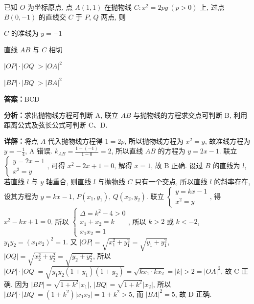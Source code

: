 \begin{question}[points=5]
已知 $O$ 为坐标原点, 点 $A(1,1)$ 在抛物线 $C: x^2 = 2py\ (p > 0)$ 上, 过点 $B(0,-1)$ 的直线交 $C$ 于 $P$, $Q$ 两点, 则
\begin{choices}
  \item $C$ 的准线为 $y = -1$
  \item 直线 $AB$ 与 $C$ 相切
  \item $|OP| \cdot |OQ| > |OA|^2$
  \item $|BP| \cdot |BQ| > |BA|^2$
\end{choices}
\begin{solution}
\textbf{答案：}BCD

\textbf{分析：}求出抛物线方程可判断 A, 联立 $AB$ 与抛物线的方程求交点可判断 B, 利用距离公式及弦长公式可判断 C、D.

\textbf{详解：}将点 $A$ 代入抛物线方程得 $1 = 2p$, 所以抛物线方程为 $x^2 = y$, 故准线方程为 $y = -\frac{1}{4}$, A 错误. $k_{AB} = \frac{1 - (-1)}{1 - 0} = 2$, 所以直线 $AB$ 的方程为 $y = 2x - 1$. 联立 $\begin{cases} y = 2x - 1 \\ x^2 = y \end{cases}$, 可得 $x^2 - 2x + 1 = 0$, 解得 $x = 1$, 故 B 正确. 设过 $B$ 的直线为 $l$, 若直线 $l$ 与 $y$ 轴重合, 则直线 $l$ 与抛物线 $C$ 只有一个交点, 所以直线 $l$ 的斜率存在, 设其方程为 $y = kx - 1$, $P(x_1, y_1)$, $Q(x_2, y_2)$. 联立 $\begin{cases} y = kx - 1 \\ x^2 = y \end{cases}$, 得 $x^2 - kx + 1 = 0$. 所以 $\begin{cases} \Delta = k^2 - 4 > 0 \\ x_1 + x_2 = k \\ x_1 x_2 = 1 \end{cases}$, 所以 $k > 2$ 或 $k < -2$, $y_1 y_2 = (x_1 x_2)^2 = 1$. 又 $|OP| = \sqrt{x_1^2 + y_1^2} = \sqrt{y_1 + y_1^2}$, $|OQ| = \sqrt{x_2^2 + y_2^2} = \sqrt{y_2 + y_2^2}$, 所以 $|OP| \cdot |OQ| = \sqrt{y_1 y_2 (1 + y_1)(1 + y_2)} = \sqrt{k x_1 \cdot k x_2} = |k| > 2 = |OA|^2$, 故 C 正确. 因为 $|BP| = \sqrt{1 + k^2} |x_1|$, $|BQ| = \sqrt{1 + k^2} |x_2|$, 所以 $|BP| \cdot |BQ| = (1 + k^2) |x_1 x_2| = 1 + k^2 > 5$, 而 $|BA|^2 = 5$, 故 D 正确.
\end{solution}
\end{question}

